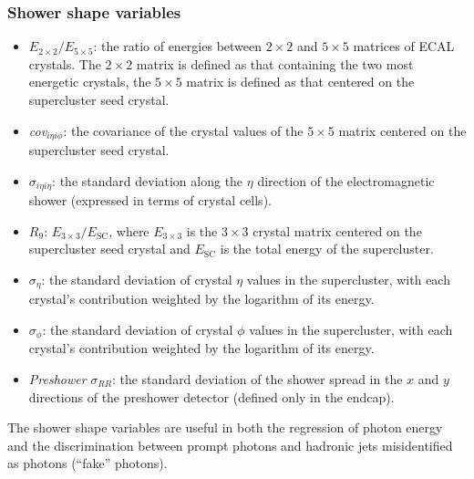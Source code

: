 \subsubsection*{Shower shape variables}
\begin{itemize}
    \item $E_{2\times2}/E_{5\times5}$: the ratio of energies between $2\times2$ and $5\times5$ matrices of ECAL crystals. The $2\times2$ matrix is defined as that containing the two most energetic crystals, the $5\times5$ matrix is defined as that centered on the supercluster seed crystal.
    \item \emph{cov}$_{i\eta i\phi}$: the covariance of the crystal values of the $5\times5$ matrix centered on the supercluster seed crystal.
    \item $\sigma_{i\eta i\eta}$: the standard deviation along the $\eta$ direction of the electromagnetic shower (expressed in terms of crystal cells).
    \item $R_9$: $E_{3\times3}/E_{\text{SC}}$, where $E_{3\times3}$ is the $3\times3$ crystal matrix centered on the supercluster seed crystal and $E_{\text{SC}}$ is the total energy of the supercluster.
    \item $\sigma_\eta$: the standard deviation of crystal $\eta$ values in the supercluster, with each crystal's contribution weighted by the logarithm of its energy.
    \item $\sigma_\phi$: the standard deviation of crystal $\phi$ values in the supercluster, with each crystal's contribution weighted by the logarithm of its energy.
    \item \emph{Preshower} $\sigma_{RR}$: the standard deviation of the shower spread in the $x$ and $y$ directions of the preshower detector (defined only in the endcap).
\end{itemize}

The shower shape variables are useful in both the regression of photon energy and the discrimination between prompt photons and hadronic jets misidentified as photons (``fake'' photons).

